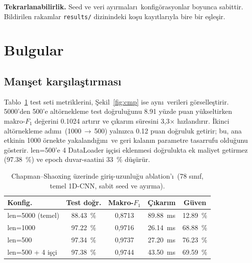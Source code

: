 \documentclass[conference]{IEEEtran}
\begin{document}
\textbf{Tekrarlanabilirlik.} Seed ve veri ay\i rmalar\i\
konfig\"{o}rasyonlar boyunca sabittir. Bildirilen rakamlar
\texttt{results/} dizinindeki ko\c{s}u kay\i tlar\i yla bire bir e\c{s}le\c{s}ir.

\section{Bulgular}
\label{sec:results}

\subsection{Manşet kar\c{s}\i la\c{s}t\i rmas\i}
Tablo~\ref{tab:main} test seti metriklerini, \c{S}ekil~\ref{fig:cmp} ise
ayn\i\ verileri g\"{o}rselle\c{s}tirir. \num{5000}'den \num{500}'e
alt\"{o}rnekleme test do\u{g}rulu\u{g}unu \num{8,91} y\"{u}zde puan
y\"{u}kseltirken makro-$F_1$ de\u{g}erini \num{0,1024} art\i r\i r ve
\c{c}\i kar\i m s\"{u}resini 3,3$\times$ h\i zland\i r\i r. \.{I}kinci
alt\"{o}rnekleme ad\i m\i\ (\num{1000}\,$\rightarrow$\,\num{500}) yaln\i zca
\num{0,12} puan do\u{g}ruluk getirir; bu, ana etkinin \num{1000} \"{o}rnekte
yakaland\i\u{g}\i n\i\ ve geri kalan\i n parametre tasarrufu oldu\u{g}unu
g\"{o}sterir. len=\num{500}'e \num{4} DataLoader i\c{s}\c{c}isi eklenmesi
do\u{g}rulukta ek maliyet getirmez (\SI{97,38}{\percent}) ve epoch
duvar-saatini \SI{33}{\percent} d\"{u}\c{s}\"{u}r\"{u}r.

\begin{table}[t]
\caption{Chapman--Shaoxing \"{u}zerinde giri\c{s}-uzunlu\u{g}u ablation'\i\
(\num{78} s\i n\i f, temel 1D-CNN, sabit seed ve ay\i rma).}
\label{tab:main}
\centering
\small
\begin{tabular}{@{}lcccc@{}}
\toprule
Konfig. & Test do\u{g}r. & Makro-$F_1$ & \c{C}\i kar\i m & G\"{u}ven \\
\midrule
len=\num{5000} (temel)   & \SI{88,43}{\percent} & 0,8713 & \SI{89,88}{\milli\second} & \SI{12,89}{\percent} \\
len=\num{1000}           & \SI{97,22}{\percent} & 0,9716 & \SI{26,14}{\milli\second} & \SI{68,88}{\percent} \\
len=\num{500}            & \SI{97,34}{\percent} & 0,9737 & \SI{27,20}{\milli\second} & \SI{76,23}{\percent} \\
len=\num{500} + 4 i\c{s}\c{c}i & \SI{97,38}{\percent} & 0,9744 & \SI{43,50}{\milli\second} & \SI{69,59}{\percent} \\
\bottomrule
\end{tabular}
\end{table}
\end{document}
